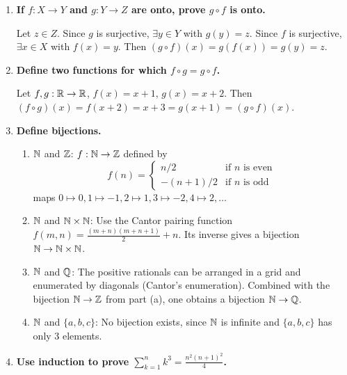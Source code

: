 \begin{enumerate}[{0.}1. ]
Suppose $(g\circ f)(x_1) = (g\circ f)(x_2)$. Then $g(f(x_1))=g(f(x_2))$. Since $g$ is injective, $f(x_1)=f(x_2)$. Since $f$ is injective, $x_1=x_2$.

\item \textbf{If $f: X\to Y$ and $g: Y\to Z$ are onto, prove $g\circ f$ is onto.}

Let $z \in Z$. Since $g$ is surjective, $\exists y \in Y$ with $g(y)=z$. Since $f$ is surjective, $\exists x \in X$ with $f(x)=y$. Then $(g\circ f)(x)=g(f(x))=g(y)=z$.

\item \textbf{Define two functions for which $f\circ g = g\circ f$.}

Let $f,g: \mathbb{R} \to \mathbb{R}$, $f(x) = x+1$, $g(x) = x+2$. Then $(f\circ g)(x) = f(x+2)=x+3 = g(x+1) = (g\circ f)(x)$.

\item \textbf{Define bijections.}

\begin{enumerate}
\item $\mathbb{N}$ and $\mathbb{Z}$: $f: \mathbb{N} \to \mathbb{Z}$ defined by
\[ f(n) = \begin{cases} n/2 & \text{if } n \text{ is even}\\ -(n+1)/2 & \text{if } n \text{ is odd}\end{cases} \]
maps $0\mapsto 0, 1\mapsto -1, 2\mapsto 1, 3\mapsto -2, 4\mapsto 2,\ldots$

\item $\mathbb{N}$ and $\mathbb{N}\times\mathbb{N}$: Use the Cantor pairing function $f(m,n) = \frac{(m+n)(m+n+1)}{2}+n$. Its inverse gives a bijection $\mathbb{N} \to \mathbb{N}\times\mathbb{N}$.

\item $\mathbb{N}$ and $\mathbb{Q}$: The positive rationals can be arranged in a grid and enumerated by diagonals (Cantor's enumeration). Combined with the bijection $\mathbb{N} \to \mathbb{Z}$ from part (a), one obtains a bijection $\mathbb{N} \to \mathbb{Q}$.

\item $\mathbb{N}$ and $\{a,b,c\}$: No bijection exists, since $\mathbb{N}$ is infinite and $\{a,b,c\}$ has only 3 elements.
\end{enumerate}

\item \textbf{Use induction to prove $\sum_{k=1}^n k^3 = \frac{n^2(n+1)^2}{4}$.}


\end{enumerate}
